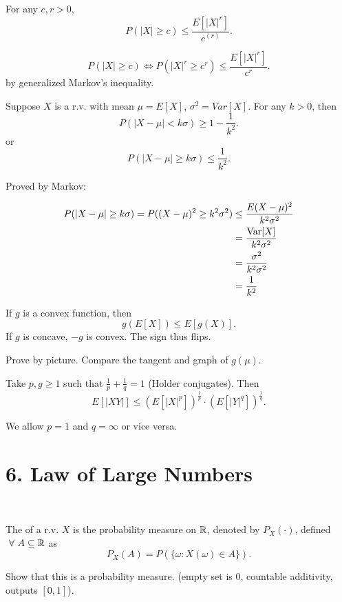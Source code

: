 \documentclass[class=article,crop=false]{standalone}
\begin{document}
\begin{thm}
For any $ c,r>0$, 
 \[
	 P(|X|\geq c) \leq \frac{E[|X|^{r}]}{c^{(r)} }
.\] 
\end{thm}
\begin{prf}
\[
	P(|X|\geq c) \iff P(|X|^{r} \geq c ^{r}) \leq \frac{E[|X|^{r}]}{c^{r} }
.\] 
by generalized Markov's inequality.
\end{prf}

\begin{thm}
	Suppose $ X$ is a r.v. with mean  $ \mu = E[X]$, $ \sigma^2 = Var[X]$. For any $ k>0$, then
	 \[
		 P(|X-\mu| < k \sigma) \geq 1-\frac{1}{k^2}
	.\] 
	or
	\[
		P(|X-\mu| \geq k \sigma) \leq \frac{1}{k^2}
	.\] 
\end{thm}
Proved by Markov:
\begin{prf}
\begin{align*}
	P(|X- \mu| \geq k \sigma) = P((X- \mu)^2 \geq k^2 \sigma^2) &\leq \frac{E(X-\mu)^2}{k^2 \sigma^2 } \\
								    &= \frac{\operatorname{Var}[X]}{k^2 \sigma^2 } \\
								    &=  \frac{\sigma^2}{k^2 \sigma^2}\\
								    &= \frac{1}{k^2} 
\end{align*}
\end{prf}

\begin{thm}
If $ g$ is a convex function, then 
 \[
	 g(E[X]) \leq E[g(X)]
.\] 
If $ g$ is concave,  $ -g$ is convex. The sign thus flips.
\end{thm}

Prove by picture. Compare the tangent and graph of $ g(\mu)$.

\begin{thm}
	Take $ p,g \geq 1$  such that $ \frac{1}{p}+\frac{1}{q}=1$ (Holder conjugates). Then
	\[
E[|XY|] \leq (E[|X|^{p}])^{\frac{1}{p}} \cdot (E[|Y|^{q}])^{\frac{1}{q}}
	.\] 
\end{thm}
We allow $ p=1$ and  $ q= \infty$ or vice versa.
\newpage
\section*{6. Law of Large Numbers}

~\begin{defn}[distribution of r.v.]
	The  of a r.v. $ X$ is the probability measure on  $ \mathbb{R}$, denoted by $ P_X( \cdot )$, defined $ \ \forall \ A \subseteq \mathbb{R}$ as
	\[
		P_X(A)= P(\{\omega: X(\omega) \in A\} )
	.\] 
\end{defn}
Show that this is a probability measure. (empty set is 0, countable additivity, outputs $ [0,1]$).
\end{document}
